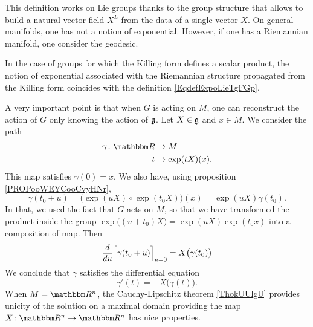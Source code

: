 This definition works on Lie groups thanks to the group structure that allows to build a natural vector field \( X^L\) from the data of a single vector \( X\). On general manifolds, one has not a notion of exponential. However, if one has a Riemannian manifold, one consider the geodesic.

In the case of groups for which the Killing form defines a scalar product, the notion of exponential associated with the Riemannian structure propagated from the Killing form coincides with the definition \eqref{EqdefExpoLieTgFGp}.

A very important point\cite{ooOLNIooDLmxkR} is that when \( G\) is acting on $M$, one can reconstruct the action of \( G\) only knowing the action of \( \mathfrak{g}\). Let \( X\in \mathfrak{g}\) and \( x\in M\). We consider the path
\begin{equation}
    \begin{aligned}
        \gamma\colon \eR&\to M \\
        t&\mapsto \exp(tX)(x). 
    \end{aligned}
\end{equation}
This map satisfies \( \gamma(0)=x\). We also have, using proposition \ref{PROPooWEYCooCvyHNr},
\begin{equation}
    \gamma(t_0+u)=\big( \exp(uX)\circ\exp(t_0X)\big)(x)=\exp(uX)\gamma(t_0).
\end{equation}
In that, we used the fact that \( G\) acts on \( M\), so that we have transformed the product inside the group \( \exp\big( (u+t_0)X \big)= \exp(uX)\exp(t_0x) \) into a composition of map.  Then
\begin{equation}
    \frac{d}{du}\Big[ \gamma(t_0+u) \Big]_{u=0}=X\big( \gamma(t_0) \big)
\end{equation}
We conclude that \( \gamma\) satisfies the differential equation
\begin{equation}        \label{EQooFGSIooUplbmN}
    \gamma'(t)=-X\big( \gamma(t) \big).
\end{equation}
When \( M=\eR^n\), the Cauchy-Lipschitz theorem \ref{ThokUUlgU} provides unicity of the solution on a maximal domain providing the map \( X\colon \eR^n\to \eR^n\) has nice properties.

